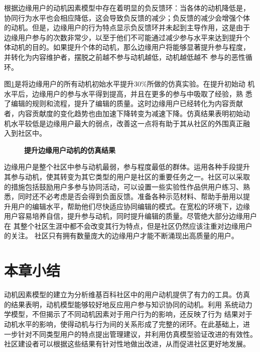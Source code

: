 根据边缘用户的动机因素模型中存在着明显的负反馈环：当各体的动机降低是，
协同行为水平也会相应降低，这会导致负反馈的减少；负反馈的减少会增强个体
的动机。但是，边缘用户的行为特点显示负反馈环并未起到主导作用，这是由于
边缘用户参与的次数非常少，以至于他们不可能通过减少参与水平来达到提升个
体动机的目的。如果提升个体的动机，那么边缘用户将能够显著提升参与程度，
并转化为内容维护者，摆脱之前越不参与动机越低，动机越低越不
参与的恶性循环。

图\ref{fig:improve9}是将边缘用户的所有动机初始水平提升$30\%$所做的仿真实验。在提升初始动
机水平后，边缘用户的参与水平得到提高，并且在更多的参与中吸取了经验，熟
悉了编辑的规则和流程，提升了编辑的质量。这时边缘用户已经转化为内容贡献
者，内容贡献度的变化趋势也由加速下降转变为减速下降。仿真结果表明初始动
机水平较低是边缘用户最大的弱点，改善这一点将有助于其从社区的外围真正融
入到社区中。

\begin{figure}[!htb]
  \centering
  
 \caption{\small{\textbf{提升边缘用户动机的仿真结果}}}
  \label{fig:improve9}
\end{figure}

边缘用户是整个社区中参与动机最弱，参与程度最低的群体。运用各种手段提升
其参与动机，使其转变为其它类型的用户是社区的重要任务之一。社区可以采取
的措施包括鼓励用户多参与协同活动，可以设置一些实验性作品供用户练习、熟
悉，同时还不必考虑是否会得到负面反馈。准备各种示范材料、帮助手册用以提
升用户的编辑水平，帮助他们尽快适应协同编辑的模式。在宽松的环境下，边缘
用户容易培养自信，提升参与动机，同时提升编辑的质量。尽管绝大部分边缘用户在
其整个社区生涯中都不会改变其行为特点，但是社区仍然应该注重对边缘用户的关注。
社区只有拥有数量庞大的边缘用户才能不断涌现出高质量的用户。

\section{本章小结}

动机因素模型的建立为分析维基百科社区中的用户动机提供了有力的工具。仿真
的结果表明，动机模型能够较好地反应用户参与知识协同的动机。利用
系统动力学模型，不但揭示了不同动机因素对于用户行为的影响，还反映了行为
结果对于动机水平的影响，使得动机与行为间的关系形成了完整的闭环。在此基础上，进
一步针对不同类型用户的特点提出管理建议，并利用仿真模型验证改进的有效性。
社区建设者可以根据这些结果有针对性地做出改进，从而促进社区更好地发展。



